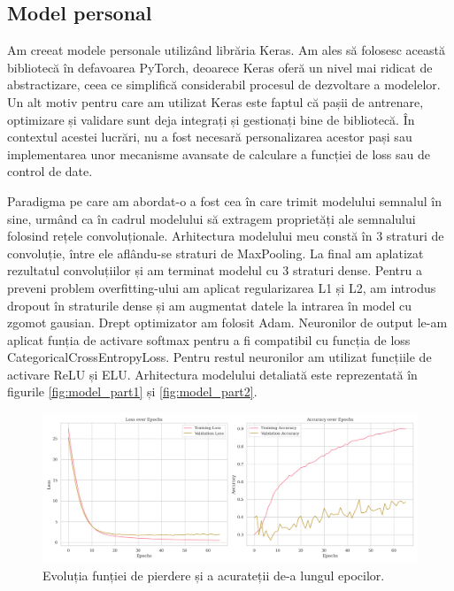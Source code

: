 \subsection{Model personal}
Am creeat modele personale utilizând librăria Keras\cite{keras}. Am ales să folosesc această bibliotecă în defavoarea PyTorch, deoarece Keras oferă un nivel mai ridicat de abstractizare, ceea ce simplifică considerabil procesul de dezvoltare a modelelor. Un alt motiv pentru care am utilizat Keras este faptul că pașii de antrenare, optimizare și validare sunt deja integrați și gestionați bine de bibliotecă. În contextul acestei lucrări, nu a fost necesară personalizarea acestor pași sau implementarea unor mecanisme avansate de calculare a funcției de loss sau de control de date. 

Paradigma pe care am abordat-o a fost cea în care trimit modelului semnalul în sine, urmând ca în cadrul modelului să extragem proprietăți ale semnalului folosind rețele convoluționale. Arhitectura modelului meu constă în 3 straturi de convoluție, între ele aflându-se straturi de MaxPooling. La final am aplatizat rezultatul convoluțiilor și am terminat modelul cu 3 straturi dense. Pentru a preveni problem overfitting-ului am aplicat regularizarea L1 și L2, am introdus dropout în straturile dense și am augmentat datele la intrarea în model cu zgomot gausian. Drept optimizator am folosit Adam. Neuronilor de output le-am aplicat funția de activare softmax pentru a fi compatibil cu funcția de loss CategoricalCrossEntropyLoss. Pentru restul neuronilor am utilizat funcțiile de activare ReLU și ELU. Arhitectura modelului detaliată este reprezentată în figurile \ref{fig:model_part1} și \ref{fig:model_part2}.

\begin{figure}[h]
    \centering
    \includegraphics[width=1\linewidth]{images/comparison_fold7.png}
    \caption{Evoluția funției de pierdere și a acurateții de-a lungul epocilor.}
    \label{fig:model_train}
\end{figure}

